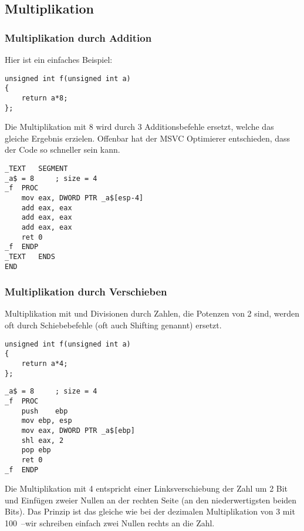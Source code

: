 \subsection{Multiplikation}

\subsubsection{Multiplikation durch Addition}

Hier ist ein einfaches Beispiel:

\begin{lstlisting}[style=customc]
unsigned int f(unsigned int a)
{
	return a*8;
};
\end{lstlisting}

Die Multiplikation mit 8 wird durch 3 Additionsbefehle ersetzt, welche das
gleiche Ergebnis erzielen. Offenbar hat der MSVC Optimierer entschieden, dass
der Code so schneller sein kann.

\begin{lstlisting}[caption=\Optimizing MSVC 2010,style=customasmx86]
_TEXT	SEGMENT
_a$ = 8		; size = 4
_f	PROC
	mov	eax, DWORD PTR _a$[esp-4]
	add	eax, eax
	add	eax, eax
	add	eax, eax
	ret	0
_f	ENDP
_TEXT	ENDS
END
\end{lstlisting}

\subsubsection{Multiplikation durch Verschieben}
\label{subsec:mult_using_shifts}
Multiplikation mit und Divisionen durch Zahlen, die Potenzen von 2 sind, werden
oft durch Schiebebefehle (oft auch Shifting genannt) ersetzt.

\begin{lstlisting}[style=customc]
unsigned int f(unsigned int a)
{
	return a*4;
};
\end{lstlisting}

\begin{lstlisting}[caption=\NonOptimizing MSVC 2010,style=customasmx86]
_a$ = 8		; size = 4
_f	PROC
	push	ebp
	mov	ebp, esp
	mov	eax, DWORD PTR _a$[ebp]
	shl	eax, 2
	pop	ebp
	ret	0
_f	ENDP
\end{lstlisting}

Die Multiplikation mit 4 entspricht einer Linksverschiebung der Zahl um 2 Bit
und Einfügen zweier Nullen an der rechten Seite (an den niederwertigsten beiden
Bits). Das Prinzip ist das gleiche wie bei der dezimalen Multiplikation von 3
mit 100~--wir schreiben einfach zwei Nullen rechts an die Zahl.

